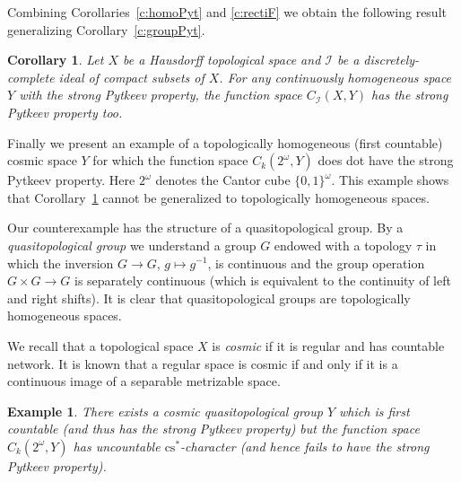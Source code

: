 \documentclass{amsart}
\newtheorem{example}[theorem]{Example}
\newtheorem{corollary}[theorem]{Corollary}
\theoremstyle{definition}
\begin{document}
Combining Corollaries~\ref{c:homoPyt} and \ref{c:rectiF} we obtain the following result generalizing Corollary~\ref{c:groupPyt}.

\begin{corollary}\label{c:contihomF} Let $X$ be a Hausdorff topological space and ${\mathcal I}$ be a  discretely-complete ideal of compact subsets of $X$. For any continuously homogeneous space $Y$ with the strong Pytkeev property, the function space $C_{\mathcal I}(X,Y)$ has the strong Pytkeev property too.
\end{corollary}

Finally we present an example of a topologically homogeneous (first countable) cosmic space $Y$ for which the function space $C_k(2^{\omega},Y)$ does dot have the strong Pytkeev property.
Here $2^{\omega}$ denotes the Cantor cube $\{0,1\}^{\omega}$. This example shows that Corollary~\ref{c:contihomF} cannot be generalized to topologically homogeneous spaces.

Our counterexample has the structure of a quasitopological group. By a {\em quasitopological group} we understand a group $G$ endowed with a topology $\tau$ in which the inversion $G\to G$, $g\mapsto g^{-1}$, is continuous and the group operation $G\times G\to G$ is separately continuous (which is equivalent to the continuity of left and right shifts). It is clear that quasitopological groups are topologically homogeneous spaces.

We recall that a topological space $X$ is {\em cosmic} if it is regular and has countable network.
It is known \cite[4.8]{Gru} that a regular space is cosmic if and only if it is a continuous image of a separable metrizable space.

\begin{example} There exists a cosmic quasitopological group $Y$ which is first countable \textup{(}and thus has the strong Pytkeev property\textup{)} but the function space $C_k(2^{\omega},Y)$ has uncountable ${\mathrm{cs}}^*$-character \textup{(}and hence fails to have the strong Pytkeev property\textup{)}.
\end{example}
\end{document}
